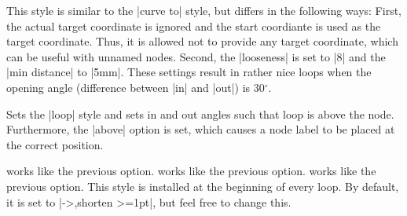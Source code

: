 \begin{itemize}
  This style is similar to the |curve to| style, but differs in the
  following ways: First, the actual target coordinate is ignored and the
  start coordiante is used as the target coordinate. Thus, it is
  allowed not to provide any target coordinate, which can be useful
  with unnamed nodes. Second, the |looseness| is set to |8| and the
  |min distance| to |5mm|. These settings result in rather nice loops
  when the opening angle (difference between |in| and |out|) is
  30$^\circ$.
\begin{codeexample}[]
\end{codeexample}
  Sets the |loop| style and sets in and out angles such that
  loop is above the node. Furthermore, the |above| option is set,
  which causes a node label to be placed at the correct position. 
\begin{codeexample}[]
\end{codeexample}
   works like the previous option.
   works like the previous option.
   works like the previous option.
   This style is installed at the beginning of
  every loop. By default, it is set to |->,shorten >=1pt|, but feel
  free to change this.
\begin{codeexample}[]
\end{codeexample}
\end{itemize}



